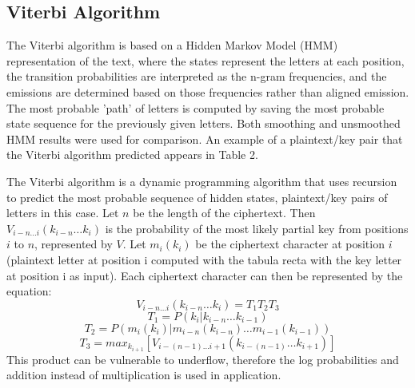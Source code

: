 \documentclass[11pt,letterpaper]{article}
\makeatletter
\newcommand{\specialcell}[2][l]{%
	\begin{tabular}[#1]{@{}l@{}}#2\end{tabular}}
\makeatother
\begin{document}
\subsection{Viterbi Algorithm}
The Viterbi algorithm is based on a Hidden Markov Model (HMM) representation of the text, where the states represent the letters at each position, the transition probabilities are interpreted as the n-gram frequencies, and the emissions are determined based on those frequencies rather than aligned emission. The most probable 'path' of letters is computed by saving the most probable state sequence for the previously given letters. Both smoothing and unsmoothed HMM results were used for comparison. An example of a plaintext/key pair that the Viterbi algorithm predicted appears in Table 2.


The Viterbi algorithm is a dynamic programming algorithm that uses recursion to predict the most probable sequence of hidden states, plaintext/key pairs of letters in this case. Let $n$ be the length of the ciphertext. Then $V_{i-n \dots i}(k_{i-n}\dots k_i)$ is the probability of the most likely partial key from positions $i$ to $n$, represented by $V$. Let $m_i(k_i)$ be the ciphertext character at position $i$ (plaintext letter at position i computed with the tabula recta with the key letter at position i as input). Each ciphertext character can then be represented by the equation:
$$V_{i-n \dots i}(k_{i-n}\dots k_i) = T_1 T_2 T_3 $$
$$T_1 = P(k_i | k_{i-n}\dots k_{i-1}) $$
$$T_2 = P(m_i(k_i) | m_{i-n}(k_{i-n}) \dots m_{i-1}(k_{i-1})) $$
$$T_3 = max_{k_{i+1}}[V_{i-(n-1) \dots i+1}(k_{i-(n-1)}\dots k_{i+1})]$$
This product can be vulnerable to underflow, therefore the log probabilities and addition instead of multiplication is used in application.
\end{document}
